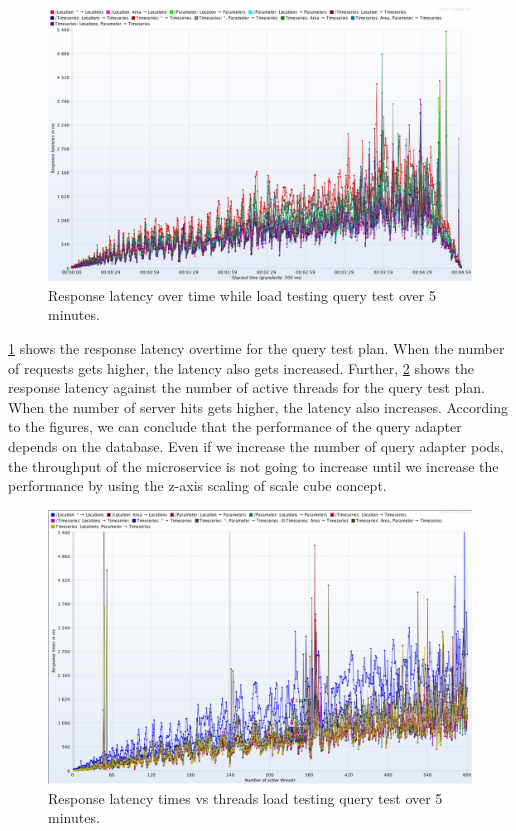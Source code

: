 \begin{figure}[htp]
    \centering
    \includegraphics[width=1.0\textwidth]{results/obs/query/obs_query_5m_latency_over_time.png}
    \caption{Response latency over time while load testing query test over 5 minutes.}
    \label{fi:test_obs_query_5m_response_latency}
\end{figure}
\cref{fi:test_obs_query_5m_response_latency} shows the response latency overtime for the query test plan. When the number of requests gets higher, the latency also gets increased. Further, \cref{fi:test_obs_query_5m_response_times_vs_threads} shows the response latency against the number of active threads for the query test plan. When the number of server hits gets higher, the latency also increases. According to the figures, we can conclude that the performance of the query adapter depends on the database. Even if we increase the number of query adapter pods, the throughput of the microservice is not going to increase until we increase the performance by using the z-axis scaling of scale cube concept.

\begin{figure}[htp]
    \centering
    \includegraphics[width=1.0\textwidth]{results/obs/query/obs_query_5m_response_times_vs_threads.png}
    \caption{Response latency times vs threads load testing query test over 5 minutes.}
    \label{fi:test_obs_query_5m_response_times_vs_threads}
\end{figure}

